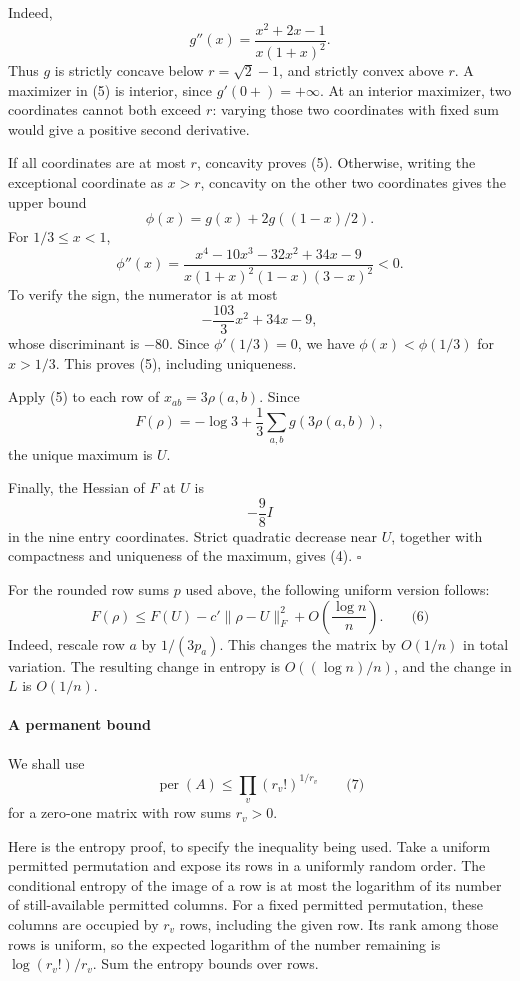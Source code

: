 \documentclass[
  11pt,
  a4paper,
]{article}
\begin{document}
Indeed, \[
g''(x)=\frac{x^2+2x-1}{x(1+x)^2}.
\] Thus \(g\) is strictly concave below \(r=\sqrt2-1\), and strictly
convex above \(r\). A maximizer in (5) is interior, since
\(g'(0+)=+\infty\). At an interior maximizer, two coordinates cannot
both exceed \(r\): varying those two coordinates with fixed sum would
give a positive second derivative.

If all coordinates are at most \(r\), concavity proves (5). Otherwise,
writing the exceptional coordinate as \(x>r\), concavity on the other
two coordinates gives the upper bound \[
\phi(x)=g(x)+2g((1-x)/2).
\] For \(1/3\le x<1\), \[
\phi''(x)=
\frac{x^4-10x^3-32x^2+34x-9}
{x(1+x)^2(1-x)(3-x)^2}<0.
\] To verify the sign, the numerator is at most \[
-\frac{103}{3}x^2+34x-9,
\] whose discriminant is \(-80\). Since \(\phi'(1/3)=0\), we have
\(\phi(x)<\phi(1/3)\) for \(x>1/3\). This proves (5), including
uniqueness.

Apply (5) to each row of \(x_{ab}=3\rho(a,b)\). Since \[
F(\rho)=-\log3+\frac13\sum_{a,b}g(3\rho(a,b)),
\] the unique maximum is \(U\).

Finally, the Hessian of \(F\) at \(U\) is \[
-\frac98 I
\] in the nine entry coordinates. Strict quadratic decrease near \(U\),
together with compactness and uniqueness of the maximum, gives (4).
\(\square\)

For the rounded row sums \(p\) used above, the following uniform version
follows: \[
F(\rho)\le F(U)-c'\|\rho-U\|_F^2
                    +O\!\left(\frac{\log n}{n}\right).           \qquad\text{(6)}
\] Indeed, rescale row \(a\) by \(1/(3p_a)\). This changes the matrix by
\(O(1/n)\) in total variation. The resulting change in entropy is
\(O((\log n)/n)\), and the change in \(L\) is \(O(1/n)\).

\paragraph{A permanent bound}\label{a-permanent-bound}

We shall use \[
\operatorname{per}(A)\le \prod_{v}(r_v!)^{1/r_v}                  \qquad\text{(7)}
\] for a zero-one matrix with row sums \(r_v>0\).

Here is the entropy proof, to specify the inequality being used. Take a
uniform permitted permutation and expose its rows in a uniformly random
order. The conditional entropy of the image of a row is at most the
logarithm of its number of still-available permitted columns. For a
fixed permitted permutation, these columns are occupied by \(r_v\) rows,
including the given row. Its rank among those rows is uniform, so the
expected logarithm of the number remaining is \(\log(r_v!)/r_v\). Sum
the entropy bounds over rows.
\end{document}
